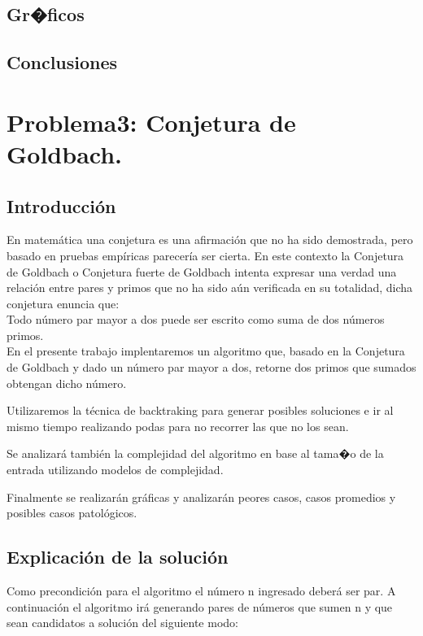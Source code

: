 \documentclass[11pt, a4paper, spanish]{article}
\begin{document}
	\subsection{Gr�ficos}
	\subsection{Conclusiones}
\newpage


\section{Problema3: Conjetura de Goldbach.}
\label{sec:problema3}
	\subsection{Introducci\'on}
	
		En matem\'atica una conjetura es una afirmaci\'on que no ha sido demostrada, pero basado en pruebas emp\'iricas parecer\'ia ser cierta. En este contexto la Conjetura de Goldbach o Conjetura fuerte de Goldbach intenta expresar una verdad una relaci\'on entre pares y primos que no ha sido a\'un verificada en su totalidad, dicha conjetura enuncia que:\\
		
		Todo n\'umero par mayor a dos puede ser escrito como suma de dos n\'umeros primos.\\
		
	En el presente trabajo implentaremos un algoritmo que, basado en la Conjetura de Goldbach y dado un n\'umero par mayor a dos, retorne dos primos que sumados obtengan dicho n\'umero.
	
	Utilizaremos la t\'ecnica de backtraking para generar posibles soluciones e ir al mismo 
tiempo realizando podas para no recorrer las que no los sean.

	Se analizar\'a tambi\'en la complejidad del algoritmo en base al tama�o de la entrada utilizando modelos de complejidad.
		
	Finalmente se realizar\'an gr\'aficas y analizar\'an peores casos, casos promedios y posibles casos patol\'ogicos.
	
	\subsection{Explicaci\'on de la soluci\'on}
	
	Como precondici\'on para el algoritmo el n\'umero n ingresado deber\'a ser par. A continuaci\'on
	el algoritmo ir\'a generando pares de n\'umeros que sumen n y que sean candidatos a soluci\'on del siguiente modo:\\
	
\end{document}
